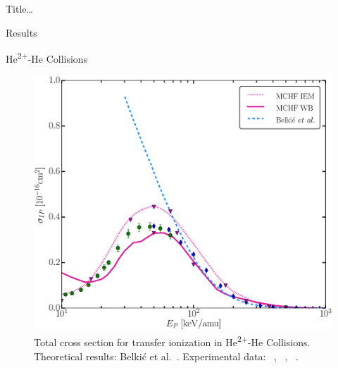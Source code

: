 \documentclass[letterpaper, 11 pt]{report}
\begin{document}
\begin{chapter}{ Title\dots \label{chap:p-he2p-he}}
\begin{section}{Results \label{sec:phe2p-res}}
\begin{subsection}{\texorpdfstring{He\textsuperscript{2+}}{He2+}-He Collisions 
                         \label{sec:he2phe-res}}
\begin{figure}[ht]
\begin{minipage}{.49\linewidth}
               \centering
               \includegraphics[width = \linewidth]{./images/he2phe/he2phe-IP.eps}
               \caption[Total cross section for transfer ionization in He\textsuperscript{2+}-He
                        Collisions.]{Total cross section for transfer ionization in
                        He\textsuperscript{2+}-He Collisions. Theoretical results: Belki\'{c}
                        et al.~\cite{BMM-97}.
                        Experimental data: {\color{blue}{$\blacklozenge$}}~\cite{SG85},
                        {\color{OliveGreen}{$\bullet$}}~\cite{SG89},
                        {\color{RedViolet}{$\blacktriangledown$}}~\cite{Dubois87}. \label{fig:he2phe-ip}}
            \end{minipage} \hspace{0.04\linewidth} %
            \begin{minipage}{.49\linewidth}


\end{minipage}
\end{figure}
\end{subsection}
\end{section}
\end{chapter}
\end{document}
